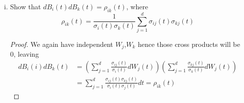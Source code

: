 \documentclass{article}
\theoremstyle{definition}
\theoremstyle{definition}
\begin{document}
\begin{enumerate}
\begin{enumerate}[(i)]
        \begin{proof} To show that each $B_i$ is a Brownian motion, we invoke Levy's theorem; specifically, it suffices to show that $dB_i(i)dB_i(t)=dt$. We first note that the sum of an integral is equal to the integral of the sum, i.e.,
        \begin{align*}
            B_i(t) &= \sum_{j=1}^d \int_0^t \frac{\sigma_{ij}(u)}{\sigma_i(u)}dW_j(u) \\
            &= \int_0^t \sum_{j=1}^d  \frac{\sigma_{ij}(u)}{\sigma_i(u)}dW_j(u) 
        \end{align*}
        Hence, 
        \begin{align*}
            dB_i(t) &= \sum_{j=1}^d  \frac{\sigma_{ij}(t)}{\sigma_i(t)} dW_j(t) \\
           dB_i(i)dB_i(t)   &= \left(\sum_{j=1}^d  \frac{\sigma_{ij}(t)}{\sigma_i(t)} dW_j(t) \right)^2
        \end{align*}
        To proceed from here, note that  each $dW_j$ is independent of $dW_k, k \neq j$, by hypothesis. Since the items in the summand are independent, the squared sum is equal to the sum of the squares\footnote{This is an application of the Binomial Theorem, where the cross products will equal $0$.}, i.e.,
        \begin{align*}
                       dB_i(i)dB_i(t)   &= \left(\sum_{j=1}^d  \frac{\sigma_{ij}(t)}{\sigma_i(t)} dW_j(t) \right)^2 = \sum_{j=1}^d  \frac{\sigma_{ij}^2(t)}{\sigma_i^2(t)} dt  = dt
        \end{align*}
    
        
        \end{proof}
        
        \item Show that $dB_i(t)dB_k(t)=\rho_{ik}(t)$, where
        $$ \rho_{ik}(t) = \frac{1}{\sigma_i(t)\sigma_k(t)}\sum_{j=1}^d \sigma_{ij}(t) \sigma_{kj}(t)$$
        
        \begin{proof}
        We again have independent $W_{j}$,$W_{k}$ hence those cross products will be $0$, leaving
           \begin{align*}
                       dB_i(i)dB_k(t)   &= \left(\sum_{j=1}^d  \frac{\sigma_{ij}(t)}{\sigma_i(t)} dW_j(t) \right)  \left(\sum_{j=1}^d  \frac{\sigma_{kj}(t)}{\sigma_k(t)} dW_j(t) \right) \\
                       &= \sum_{j=1}^d  \frac{\sigma_{ij}(t)\sigma_{kj}(t)}{\sigma_i(t)\sigma_j(t)} dt  = \rho_{ik}(t)
        \end{align*}
        \end{proof}
        

\end{enumerate}
\end{enumerate}
\end{document}
